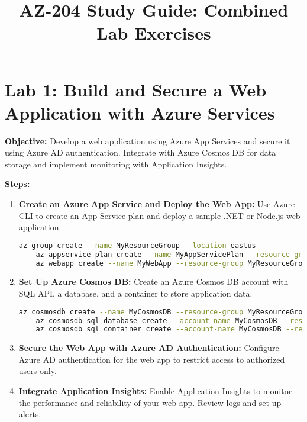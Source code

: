 \documentclass{article}
\title{AZ-204 Study Guide: Combined Lab Exercises}
\author{}
\date{}
\begin{document}
\maketitle

\section{Lab 1: Build and Secure a Web Application with Azure Services}
\textbf{Objective:} Develop a web application using Azure App Services and secure it using Azure AD authentication. Integrate with Azure Cosmos DB for data storage and implement monitoring with Application Insights.

\textbf{Steps:}
\begin{enumerate}
    \item \textbf{Create an Azure App Service and Deploy the Web App:} Use Azure CLI to create an App Service plan and deploy a sample .NET or Node.js web application.
    \begin{lstlisting}[language=bash]
    az group create --name MyResourceGroup --location eastus
    az appservice plan create --name MyAppServicePlan --resource-group MyResourceGroup --sku B1
    az webapp create --name MyWebApp --resource-group MyResourceGroup --plan MyAppServicePlan
    \end{lstlisting}

    \item \textbf{Set Up Azure Cosmos DB:} Create an Azure Cosmos DB account with SQL API, a database, and a container to store application data.
    \begin{lstlisting}[language=bash]
    az cosmosdb create --name MyCosmosDB --resource-group MyResourceGroup --kind GlobalDocumentDB
    az cosmosdb sql database create --account-name MyCosmosDB --resource-group MyResourceGroup --name MyDatabase
    az cosmosdb sql container create --account-name MyCosmosDB --resource-group MyResourceGroup --database-name MyDatabase --name MyContainer --partition-key-path "/partitionKey"
    \end{lstlisting}

    \item \textbf{Secure the Web App with Azure AD Authentication:} Configure Azure AD authentication for the web app to restrict access to authorized users only.

    \item \textbf{Integrate Application Insights:} Enable Application Insights to monitor the performance and reliability of your web app. Review logs and set up alerts.
\end{enumerate}
\end{document}
